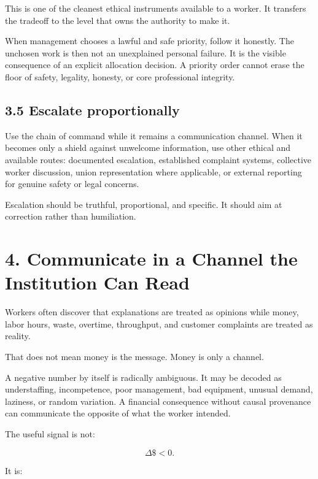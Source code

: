 \documentclass[11pt,oneside]{article}
\begin{document}
This is one of the cleanest ethical instruments available to a worker.
It transfers the tradeoff to the level that owns the authority to make
it.

When management chooses a lawful and safe priority, follow it honestly.
The unchosen work is then not an unexplained personal failure. It is the
visible consequence of an explicit allocation decision. A priority order
cannot erase the floor of safety, legality, honesty, or core
professional integrity.

\hypertarget{escalate-proportionally}{%
\subsection{3.5 Escalate proportionally}\label{escalate-proportionally}}

Use the chain of command while it remains a communication channel. When
it becomes only a shield against unwelcome information, use other
ethical and available routes: documented escalation, established
complaint systems, collective worker discussion, union representation
where applicable, or external reporting for genuine safety or legal
concerns.

Escalation should be truthful, proportional, and specific. It should aim
at correction rather than humiliation.

\hypertarget{communicate-in-a-channel-the-institution-can-read}{%
\section{4. Communicate in a Channel the Institution Can
Read}\label{communicate-in-a-channel-the-institution-can-read}}

Workers often discover that explanations are treated as opinions while
money, labor hours, waste, overtime, throughput, and customer complaints
are treated as reality.

That does not mean money is the message. Money is only a channel.

A negative number by itself is radically ambiguous. It may be decoded as
understaffing, incompetence, poor management, bad equipment, unusual
demand, laziness, or random variation. A financial consequence without
causal provenance can communicate the opposite of what the worker
intended.

The useful signal is not:

\[
\Delta \$ < 0.
\]

It is:
\end{document}
